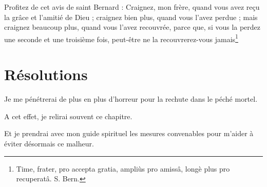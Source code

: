 \documentclass[instructions.tex]{subfiles}
\begin{document}
Profitez de cet avis de saint Bernard : Craignez, mon frère, quand vous avez reçu la grâce et l’amitié de Dieu ; craignez bien plus, quand vous l’avez perdue ; mais craignez beaucoup plus, quand vous l’avez recouvrée, parce que, si vous la perdez une seconde et une troisième fois, peut-être ne la recouvrerez-vous jamais\footnote{Time, frater, pro accepta gratia, ampliùs pro amissâ, longè plus pro recuperatâ. S. Bern.}
 
\section{Résolutions}
 
\primo Je me pénétrerai de plus en plus d’horreur pour la rechute dans le péché mortel.
 
\secundo A cet effet, je relirai souvent ce chapitre.
 
\tertio Et je prendrai avec mon guide spirituel les mesures convenables pour m’aider à éviter désormais ce malheur. 

 
\end{document}
